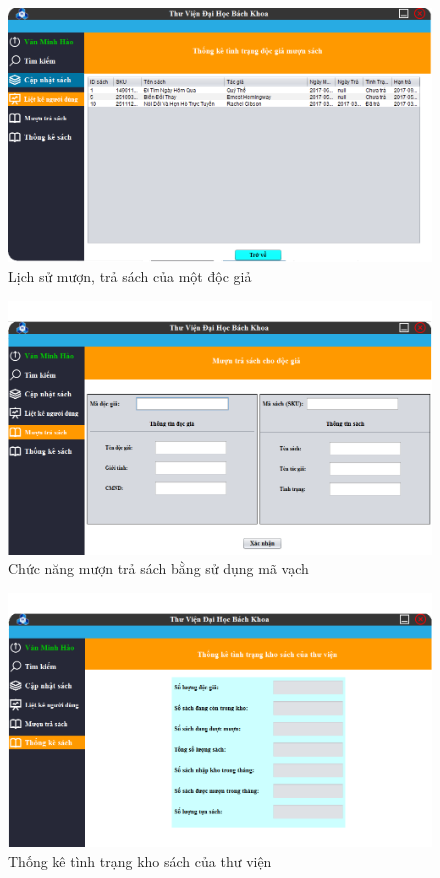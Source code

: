 \documentclass[12pt]{report}
\begin{document}
						\begin{figure}
						\centering
						\includegraphics[scale=0.65]{images/mgr5.png}
						\caption{Lịch sử mượn, trả sách của một độc giả}
						\label{fig:mgruserstats2}
						\end{figure}
						
						\begin{figure}
						\centering
						\includegraphics[scale=0.65]{images/mgr6.png}
						\caption{Chức năng mượn trả sách bằng sử dụng mã vạch}
						\label{fig:mgrborrowbook}
						\end{figure}
						
						\begin{figure}
						\centering
						\includegraphics[scale=0.65]{images/mgr7.png}
						\caption{Thống kê tình trạng kho sách của thư viện}
						\label{fig:mgrstoragestats}
						\end{figure}
\end{document}
